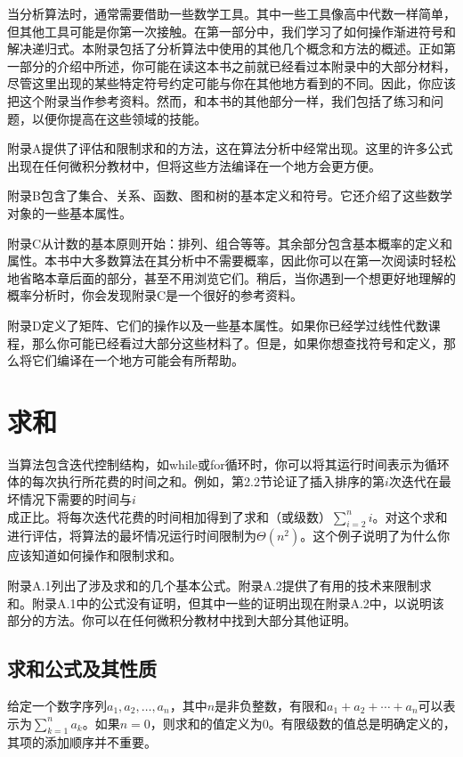 \documentclass[lang=cn,newtx,10pt,scheme=chinese]{elegantbook}
\begin{document}
当分析算法时，通常需要借助一些数学工具。其中一些工具像高中代数一样简单，但其他工具可能是你第一次接触。在第一部分中，我们学习了如何操作渐进符号和解决递归式。本附录包括了分析算法中使用的其他几个概念和方法的概述。正如第一部分的介绍中所述，你可能在读这本书之前就已经看过本附录中的大部分材料，尽管这里出现的某些特定符号约定可能与你在其他地方看到的不同。因此，你应该把这个附录当作参考资料。然而，和本书的其他部分一样，我们包括了练习和问题，以便你提高在这些领域的技能。

附录A提供了评估和限制求和的方法，这在算法分析中经常出现。这里的许多公式出现在任何微积分教材中，但将这些方法编译在一个地方会更方便。

附录B包含了集合、关系、函数、图和树的基本定义和符号。它还介绍了这些数学对象的一些基本属性。

附录C从计数的基本原则开始：排列、组合等等。其余部分包含基本概率的定义和属性。本书中大多数算法在其分析中不需要概率，因此你可以在第一次阅读时轻松地省略本章后面的部分，甚至不用浏览它们。稍后，当你遇到一个想更好地理解的概率分析时，你会发现附录C是一个很好的参考资料。

附录D定义了矩阵、它们的操作以及一些基本属性。如果你已经学过线性代数课程，那么你可能已经看过大部分这些材料了。但是，如果你想查找符号和定义，那么将它们编译在一个地方可能会有所帮助。

\chapter{求和}

当算法包含迭代控制结构，如while或for循环时，你可以将其运行时间表示为循环体的每次执行所花费的时间之和。例如，第2.2节论证了插入排序的第$i$次迭代在最坏情况下需要的时间与$i$成正比。将每次迭代花费的时间相加得到了求和（或级数）$\sum_{i=2}^n i$。对这个求和进行评估，将算法的最坏情况运行时间限制为$\Theta\left(n^2\right)$。这个例子说明了为什么你应该知道如何操作和限制求和。

附录A.1列出了涉及求和的几个基本公式。附录A.2提供了有用的技术来限制求和。附录A.1中的公式没有证明，但其中一些的证明出现在附录A.2中，以说明该部分的方法。你可以在任何微积分教材中找到大部分其他证明。

\section{求和公式及其性质}

给定一个数字序列$a_1,a_2,\ldots,a_n$，其中$n$是非负整数，有限和$a_1+a_2+\cdots+a_n$可以表示为$\sum_{k=1}^n a_k$。如果$n=0$，则求和的值定义为0。有限级数的值总是明确定义的，其项的添加顺序并不重要。
\end{document}

